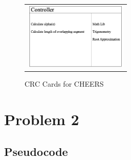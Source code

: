 \documentclass{report}
\begin{document}
\begin{figure}[h!]
        \begin{tabular}{@{}c@{}}
          \includegraphics[width=.4\linewidth,height=90pt]{resources/Controller.png}
        \end{tabular}

        \vspace{\floatsep}
      \caption{CRC Cards for CHEERS}\label{fig:myfig}
  \end{figure}

\chapter{Problem 2}
\section{Pseudocode}
\end{document}
